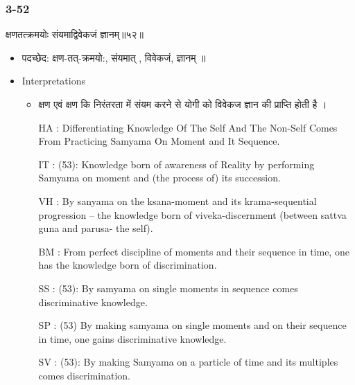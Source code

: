 \begin{frame}[fragile]\frametitle{3-52}
\begin{sanskrit}
क्षणतत्क्रमयोः संयमाद्विवेकजं ज्ञानम्॥५२॥
\end{sanskrit}

	\begin{itemize}
	\item पदच्छेद:  क्षण-तत्-क्रमयो:, संयमात् , विवेकजं, ज्ञानम् ‌॥
	\item Interpretations
		\begin{itemize}	
		\item क्षण एवं क्षण कि निरंतरता में संयम करने से योगी को विवेकज ज्ञान की प्राप्ति होती है ।
		\item [HA]: Differentiating Knowledge Of The Self And The Non-Self Comes From Practicing Samyama On Moment and It Sequence.
		\item [IT]: (53): Knowledge born of awareness of Reality by performing Samyama on moment and (the process of) its succession.
		\item [VH]: By sanyama on the ksana-moment and its krama-sequential progression – the knowledge born of viveka-discernment (between sattva guna and parusa- the self).
		\item [BM]: From perfect discipline of moments and their sequence in time, one has the knowledge born of discrimination.
		\item [SS]: (53): By samyama on single moments in sequence comes discriminative knowledge.
		\item [SP]: (53) By making samyama on single moments and on their sequence in time, one gains discriminative knowledge.
		\item [SV]: (53): By making Samyama on a particle of time and its multiples comes discrimination. 
		\end{itemize}
	\end{itemize}
\end{frame}


